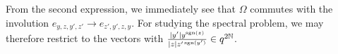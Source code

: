From the second expression, we immediately see that $\Omega$ commutes with the involution $e_{y,z,y',z'}\rightarrow e_{z',y',z,y}$. For studying the spectral problem, we may therefore restrict to the vectors with $\frac{|y'| y^{\operatorname{\mathrm{sgn}}(z)}}{|z|z'^{\operatorname{\mathrm{sgn}}(y')}} \in q^{2\mathbb{N}}$. 



